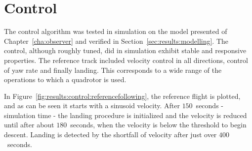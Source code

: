 \section{Control}
\label{sec:results:control}
    The control algorithm was tested in simulation on the model presented
    of Chapter~\ref{cha:observer} and verified in Section~\ref{sec:results:modelling}.
    The control, although roughly tuned, did in simulation exhibit stable and responsive
    properties. The reference track included velocity control in all directions,
    control of yaw rate and finally landing. This corresponds to a wide
    range of the operations to which a quadrotor is used.

    In Figure~\ref{fig:results:control:referencefollowing}, the reference
    flight is plotted, and as can be seen it starts with a sinusoid velocity.
    After $150$~seconds - simulation time - the landing procedure is initialized and the velocity is
    reduced until after about $180$~seconds, when the velocity is below the threshold
    to begin descent. Landing is detected by the shortfall of velocity
    after just over $400$~seconds.

